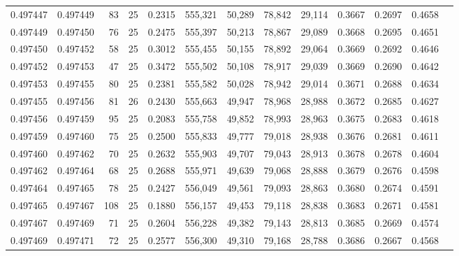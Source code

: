 \begin{tabular}{rrrrrrrrrrrrr}
0.497447 & 0.497449 &    83 &  25 &                                     0.2315 & 555,321 &  50,289 &  78,842 &  29,114 & 0.3667 & 0.2697 & 0.4658 \\
0.497449 & 0.497450 &    76 &  25 &                                     0.2475 & 555,397 &  50,213 &  78,867 &  29,089 & 0.3668 & 0.2695 & 0.4651 \\
0.497450 & 0.497452 &    58 &  25 &                                     0.3012 & 555,455 &  50,155 &  78,892 &  29,064 & 0.3669 & 0.2692 & 0.4646 \\
0.497452 & 0.497453 &    47 &  25 &                                     0.3472 & 555,502 &  50,108 &  78,917 &  29,039 & 0.3669 & 0.2690 & 0.4642 \\
0.497453 & 0.497455 &    80 &  25 &                                     0.2381 & 555,582 &  50,028 &  78,942 &  29,014 & 0.3671 & 0.2688 & 0.4634 \\
0.497455 & 0.497456 &    81 &  26 &                                     0.2430 & 555,663 &  49,947 &  78,968 &  28,988 & 0.3672 & 0.2685 & 0.4627 \\
0.497456 & 0.497459 &    95 &  25 &                                     0.2083 & 555,758 &  49,852 &  78,993 &  28,963 & 0.3675 & 0.2683 & 0.4618 \\
0.497459 & 0.497460 &    75 &  25 &                                     0.2500 & 555,833 &  49,777 &  79,018 &  28,938 & 0.3676 & 0.2681 & 0.4611 \\
0.497460 & 0.497462 &    70 &  25 &                                     0.2632 & 555,903 &  49,707 &  79,043 &  28,913 & 0.3678 & 0.2678 & 0.4604 \\
0.497462 & 0.497464 &    68 &  25 &                                     0.2688 & 555,971 &  49,639 &  79,068 &  28,888 & 0.3679 & 0.2676 & 0.4598 \\
0.497464 & 0.497465 &    78 &  25 &                                     0.2427 & 556,049 &  49,561 &  79,093 &  28,863 & 0.3680 & 0.2674 & 0.4591 \\
0.497465 & 0.497467 &   108 &  25 &                                     0.1880 & 556,157 &  49,453 &  79,118 &  28,838 & 0.3683 & 0.2671 & 0.4581 \\
0.497467 & 0.497469 &    71 &  25 &                                     0.2604 & 556,228 &  49,382 &  79,143 &  28,813 & 0.3685 & 0.2669 & 0.4574 \\
0.497469 & 0.497471 &    72 &  25 &                                     0.2577 & 556,300 &  49,310 &  79,168 &  28,788 & 0.3686 & 0.2667 & 0.4568 \\

\end{tabular}
